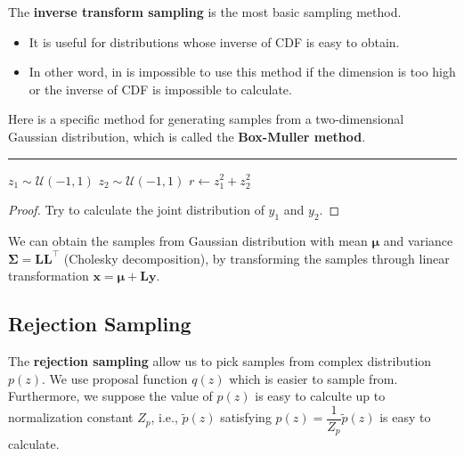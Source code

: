 \documentclass{article}
\begin{document}
        The \textbf{inverse transform sampling} is the most basic sampling method.
        \begin{itemize}
            \item It is useful for distributions whose inverse of CDF is easy to obtain.
            \item In other word, in is impossible to use this method if the dimension is too high or the inverse of CDF is impossible to calculate.
        \end{itemize}
    
        Here is a specific method for generating samples from a two-dimensional Gaussian distribution, which is called the \textbf{Box-Muller method}.


        \begin{algorithm}[H]
            \DontPrintSemicolon
            \caption{Box-Muller algorithm}


            \BlankLine
            \hrule

            $z_1 \sim \mathcal U(-1,1)$\;
            $z_2 \sim \mathcal U(-1,1)$\;
            $r \leftarrow z_1^2+z_2^2$\;
        \end{algorithm}
        \begin{proof}
            Try to calculate the joint distribution of $y_1$ and $y_2$.
        \end{proof}
        We can obtain the samples from Gaussian distribution with mean $\bm{\mu}$ and variance $\bm{\Sigma}=\mathbf{L}\mathbf{L}^{\top}$ (Cholesky decomposition),
        by transforming the samples through linear transformation $\textbf{x}=\bm{\mu}+\textbf{L}\textbf{y}$.

    \subsection{Rejection Sampling}
        The \textbf{rejection sampling} allow us to pick samples from complex distribution $p(z)$. We use proposal function $q(z)$ which is easier to
        sample from. Furthermore, we suppose the value of $p(z)$ is easy to calculte up to normalization constant $Z_p$, i.e.,
        $\tilde{p}(z)$ satisfying $p(z)=\dfrac{1}{Z_p}\tilde{p}(z)$ is easy to calculate.
\end{document}
